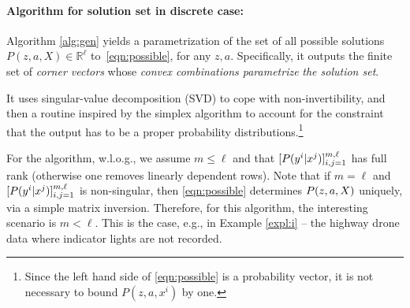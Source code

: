 \documentclass[letterpaper]{article} %
\theoremstyle{definition}%
\theoremstyle{definition}
\newcommand{\out}{z}
\newcommand{\todo}[1]{\textcolor{red}{#1}}
\begin{document}

\paragraph{Algorithm for solution set in discrete case:}
Algorithm \ref{alg:gen} yields a parametrization of the set of all possible solutions $P(\out, a, X) \in \mathbb{R}^\ell$ to~\eqref{eqn:possible}, for any $\out, a$. Specifically, it outputs the finite set of \emph{corner vectors} whose \emph{convex combinations parametrize} \emph{the solution set}.

It uses singular-value decomposition (SVD) to cope with non-invertibility, and then a routine inspired by the simplex algorithm to account for the constraint that the output has to be a proper probability distributions.\footnote{Since the left hand side of \eqref{eqn:possible} is a probability vector, it is not necessary to bound $P(z, a, x^i)$ by one.}

For the algorithm, w.l.o.g., we assume $m \leq \ell$ and that $[P( y^i | x^j)]_{i,j=1}^{m, \ell}$ has full rank (otherwise one removes linearly dependent rows).
Note that if $m=\ell$ and $[P( y^i | x^j)]_{i,j=1}^{m, \ell}$ is non-singular, then %
\eqref{eqn:possible} determines $\w$ uniquely, via a simple matrix inversion. 
Therefore, for this algorithm, the interesting scenario is %
	$m<\ell$. This is the case, e.g., in Example \ref{expl:i} -- the highway drone data where indicator lights are not recorded. 
\end{document}
